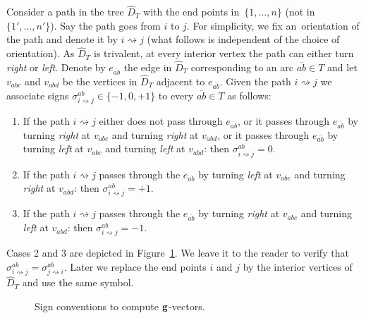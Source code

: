 \documentclass[pdftex]{sigma}%
\numberwithin{equation}{section}
\begin{document}
Consider a path in the tree $\widehat D_T$ with the end points in~$\{1,\dots,n\}$ (not in~$\{1',\dots,n'\}$).
Say the path goes from $i$ to $j$.
For simplicity, we fix an~ori\-en\-tation of the path and denote it by $i\rightsquigarrow j$ (what follows is independent of the choice of orientation).
As $\widehat D_T$ is trivalent, at every interior vertex the path can either turn \emph{right} or \emph{left}.
Denote by $e_{\overline{ab}}$ the edge in $\widehat{D}_T$ corresponding to an arc $\overline{ab}\in T$ and let $v_{abc}$ and $v_{abd}$ be the vertices in $\widehat{D}_T$ adjacent to $e_{\overline{ab}}$.
Given the path $i\rightsquigarrow j$ we associate signs $\sigma_{i\rightsquigarrow j}^{ab}\in \{-1,0,+1\}$ to every $\overline{ab}\in T$ as follows:
\begin{enumerate}\itemsep=0pt
 \item
 If the path $i\rightsquigarrow j$ either does not pass through $e_{\overline{ab}}$, or it passes through $e_{\overline{ab}}$ by turning \emph{right} at $v_{abc}$ and turning \emph{right} at $v_{abd}$, or it passes through $e_{\overline{ab}}$ by turning \emph{left} at $v_{abc}$ and turning \emph{left} at $v_{abd}$: then
 $\sigma_{i\rightsquigarrow j}^{{ab}}=0$.
 \item If the path $i\rightsquigarrow j$ passes through the $e_{\overline{ab}}$ by turning \emph{left} at $v_{abc}$ and turning \emph{right} at $v_{abd}$: then $\sigma_{i\rightsquigarrow j}^{{ab}}=+1$.
 \item If the path $i\rightsquigarrow j$ passes through the $e_{\overline{ab}}$ by turning \emph{right} at $v_{abc}$ and turning \emph{left} at $v_{abd}$: then $\sigma_{i\rightsquigarrow j}^{{ab}}=-1$.
\end{enumerate}

Cases 2 and 3 are depicted in Figure~\ref{fig:sign g-v}. We leave it to the reader to verify that $\sigma_{i\rightsquigarrow j}^{{ab}}=\sigma_{j\rightsquigarrow i}^{{ab}}$.
Later we replace the end points $i$ and $j$ by the interior vertices of $\widehat{D}_T$ and use the same symbol.

\begin{figure}[ht]
 \centering
{}
 \caption{Sign conventions to compute ${\bf g}$-vectors.}
 \label{fig:sign g-v}
\end{figure}
\end{document}
